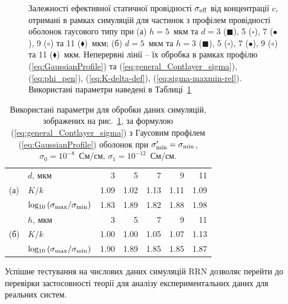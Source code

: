 \documentclass[14pt,twoside]{vakthesis}
\begin{document}
\begin{figure}[tb]
\begin{subfigure}[c]{0.48\textwidth}
	\end{subfigure}
	\caption{\label{fig:simulations-sigma-Glayer2006} Залежності ефективної статичної провідності $\sigma_{\rm eff}$ від концентрації $c$, отримані в рамках симуляцій \cite{Siekierski2006} для частинок з профілем провідності оболонок гаусового типу при (а) $h = 5$~мкм та $d = 3$ ($\blacksquare$), 5 ($\square$), 7 ($\bullet$), 9 ($\circ$) та 11 ($\blacklozenge$)~мкм; (б) $d = 5$~мкм та $h = 3$ ($\blacksquare$), 5 ($\square$), 7 ($\bullet$), 9 ($\circ$) та 11 ($\blacklozenge$)~мкм. Неперервні лінії -- їх обробка в рамках профілю (\ref{eq:GaussianProfile}) та (\ref{eq:general_Contlayer_sigma}), (\ref{eq:phi_pen}), (\ref{eq:K-delta-def}), (\ref{eq:sigma-maxmin-rel}). Використані параметри наведені в Таблиці~\ref{tab:numerical-inhomogeneous-1}}
\end{figure}

\begin{table}[htb]
	\caption{\label{tab:numerical-inhomogeneous-1} Використані параметри для обробки даних симуляцій, зображених на рис.~\ref{fig:simulations-sigma-Glayer2006}, за формулою (\ref{eq:general_Contlayer_sigma}) з Гаусовим профілем  (\ref{eq:GaussianProfile}) оболонок при $\sigma'_{\rm min} = \sigma_{\rm min}$, $\sigma_0 = 10^{-8}$~См/см, $\sigma_1 = 10^{-12}$~См/см.}
	\begin{center}
		\begin{tabular}{|l|l|r|r|r|r|r|}
			\hline
			\multirow{3}{*}{(а)} & $d$, мкм & 3    & 5    & 7     & 9     & 11    \\ \cline{2-7}
			& $K/k$    & 1.09 & 1.02 & 1.13  & 1.11  & 1.09   \\ 
			\cline{2-7}
			& ${\rm log_{10}}\left(\sigma_{\rm max}/\sigma_{\rm min}\right)$
			& 1.83 & 1.89 & 1.82 & 1.88 & 1.98\\
			\hline
			\multirow{3}{*}{(б)} & $h$, мкм & 3    & 5    & 7     & 9     & 11    \\ \cline{2-7}
			& $K/k$    & 1.00  & 1.00  & 1.05 & 1.07 & 1.13  \\ \cline{2-7}
			& ${\rm log_{10}}\left(\sigma_{\rm max}/\sigma_{\rm min}\right)$
			& 1.90  & 1.89  & 1.85 & 1.85 & 1.87 \\
			\hline
		\end{tabular}
	\end{center}
\end{table}

Успішне тестування на числових даних симуляцій RRN дозволяє перейти до перевірки застосовності теорії для аналізу експериментальних даних для реальних систем. 
\end{document}
